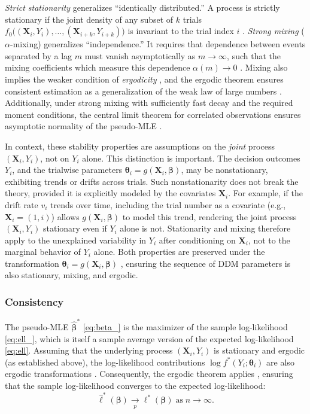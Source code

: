 \documentclass[00-main.tex]{subfiles}
\begin{document}
\emph{Strict stationarity} generalizes ``identically distributed.'' A process is strictly stationary if the joint density of any subset of $k$ trials $f_0\bigl((\bm{X}_i, Y_i), \dots, (\bm{X}_{i+k}, Y_{i+k})\bigr)$ is invariant to the trial index $i$ \citep[Definition~14.2]{hansen_econometrics_2022}. \emph{Strong mixing} ($\alpha$-mixing) generalizes ``independence.'' It requires that dependence between events separated by a lag $m$ must vanish asymptotically as $m\to\infty$, such that the mixing coefficients which measure this dependence $\alpha(m)\to0$ \citep[Section~14.12]{hansen_econometrics_2022}. Mixing also implies the weaker condition of \emph{ergodicity} \citep[Theorem~14.14]{hansen_econometrics_2022}, and the ergodic theorem ensures consistent estimation as a generalization of the weak law of large numbers \citep[Theorem~14.9]{hansen_econometrics_2022}. Additionally, under strong mixing with sufficiently fast decay and the required moment conditions, the central limit theorem for correlated observations ensures asymptotic normality of the pseudo-MLE \citep[Theorem~14.15]{hansen_econometrics_2022}.

In context, these stability properties are assumptions on the \emph{joint} process $(\bm{X}_i, Y_i)$, not on $Y_i$ alone. This distinction is important. The decision outcomes $Y_i$, and the trialwise parameters $\bm{\theta}_i = g(\bm{X}_i, \bm{\beta})$, may be nonstationary, exhibiting trends or drifts across trials. Such nonstationarity does not break the theory, provided it is explicitly modeled by the covariates $\bm{X}_i$. For example, if the drift rate $v_i$ trends over time, including the trial number as a covariate (e.g.,\ $\bm{X}_i = (1, i)$) allows $g(\bm{X}_i, \bm{\beta})$ to model this trend, rendering the joint process $(\bm{X}_i, Y_i)$ stationary even if $Y_i$ alone is not. Stationarity and mixing therefore apply to the unexplained variability in $Y_i$ after conditioning on $\bm{X}_i$, not to the marginal behavior of $Y_i$ alone. Both properties are preserved under the transformation $\bm{\theta}_i = g(\bm{X}_i, \bm{\beta})$ \citep[Theorems~14.2,14.12]{hansen_econometrics_2022}, ensuring the sequence of DDM parameters is also stationary, mixing, and ergodic.

\subsubsection{Consistency}
The pseudo-MLE $\hat{\bm{\beta}}^*$ \eqref{eq:beta_} is the maximizer of the sample log-likelihood \eqref{eq:ell_}, which is itself a sample average version of the expected log-likelihood \eqref{eq:ell}. Assuming that the underlying process $(\bm{X}_i, Y_i)$ is stationary and ergodic (as established above), the log-likelihood contributions $\log f^*(Y_i; \bm\theta_i)$ are also ergodic transformations \citep[Theorem~14.5]{hansen_econometrics_2022}. Consequently, the ergodic theorem applies \citep[Theorem~14.9]{hansen_econometrics_2022}, ensuring that the sample log-likelihood converges to the expected log-likelihood:
\begin{equation}
    \hat{\ell}^*(\bm\beta)  \underset{p}{\to} \ell^*(\bm\beta) \;\text{as}\;n\to\infty.
\end{equation}
\end{document}
